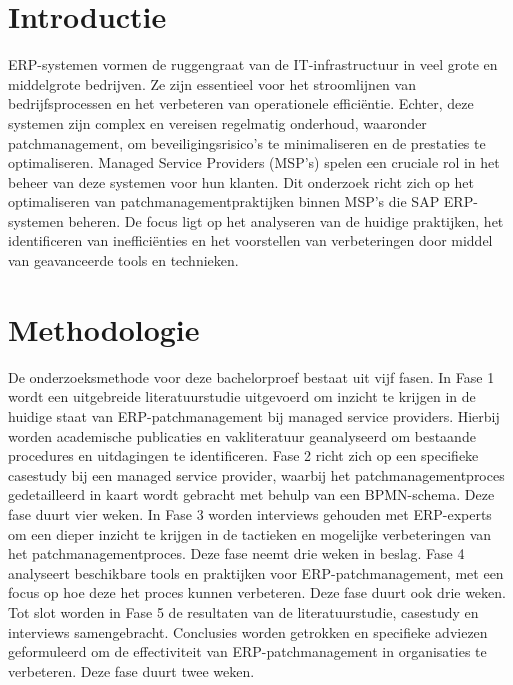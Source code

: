 \documentclass[a0,portrait]{hogent-poster}
\begin{document}
\begin{multicols}{2} %

\section{Introductie}
ERP-systemen vormen de ruggengraat van de IT-infrastructuur in veel grote en middelgrote bedrijven. Ze zijn essentieel voor het stroomlijnen van bedrijfsprocessen en het verbeteren van operationele efficiëntie. Echter, deze systemen zijn complex en vereisen regelmatig onderhoud, waaronder patchmanagement, om beveiligingsrisico's te minimaliseren en de prestaties te optimaliseren. Managed Service Providers (MSP's) spelen een cruciale rol in het beheer van deze systemen voor hun klanten. Dit onderzoek richt zich op het optimaliseren van patchmanagementpraktijken binnen MSP's die SAP ERP-systemen beheren. De focus ligt op het analyseren van de huidige praktijken, het identificeren van inefficiënties en het voorstellen van verbeteringen door middel van geavanceerde tools en technieken.

\section{Methodologie}
De onderzoeksmethode voor deze bachelorproef bestaat uit vijf fasen. In Fase 1 wordt een uitgebreide literatuurstudie uitgevoerd om inzicht te krijgen in de huidige staat van ERP-patchmanagement bij managed service providers. Hierbij worden academische publicaties en vakliteratuur geanalyseerd om bestaande procedures en uitdagingen te identificeren. Fase 2 richt zich op een specifieke casestudy bij een managed service provider, waarbij 
het patchmanagementproces gedetailleerd in kaart wordt gebracht met behulp van een BPMN-schema. Deze fase duurt vier weken. In Fase 3 worden interviews gehouden met ERP-experts om een dieper inzicht te krijgen in de tactieken en mogelijke verbeteringen van het patchmanagementproces. Deze fase neemt drie weken in beslag. Fase 4 analyseert beschikbare tools en praktijken voor ERP-patchmanagement, met een focus op hoe deze het proces kunnen verbeteren. Deze fase 
duurt ook drie weken. Tot slot worden in Fase 5 de resultaten van de literatuurstudie, casestudy en interviews samengebracht. Conclusies worden getrokken en specifieke adviezen geformuleerd om de effectiviteit van ERP-patchmanagement in organisaties te verbeteren. Deze fase duurt twee weken.



\end{multicols}
\end{document}
